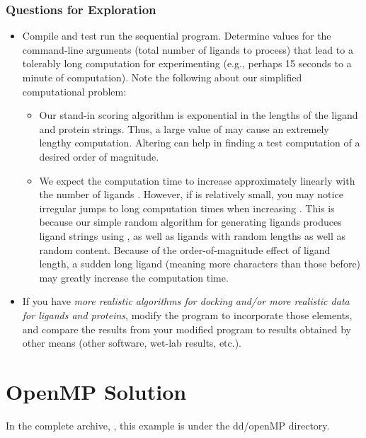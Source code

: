 \documentclass[letterpaper,10pt,openany,oneside]{sphinxmanual}
\begin{document}
\subsubsection{Questions for Exploration}
\label{sequentialimplementation/sequentialimplementation:questions-for-exploration}\label{sequentialimplementation/sequentialimplementation:stl-containers}\begin{itemize}
\item {} 
Compile and test run the sequential program. Determine values for the command-line arguments  (total number of ligands to process) that lead to a tolerably long computation for experimenting (e.g., perhaps 15 seconds to a minute of computation). Note the following about our simplified computational problem:
\begin{itemize}
\item {} 
Our stand-in scoring algorithm is exponential in the lengths of the ligand and protein strings. Thus, a large value of  may cause an extremely lengthy computation. Altering  can help in finding a test computation of a desired order of magnitude.

\item {} 
We expect the computation time to increase approximately linearly with the number of ligands . However, if  is relatively small, you may notice irregular jumps to long computation times when increasing . This is because our simple random algorithm for generating ligands produces ligand strings using , as well as ligands with random lengths as well as random content.  Because of the order-of-magnitude effect of ligand length, a sudden long ligand (meaning more characters than those before) may greatly increase the computation time.

\end{itemize}

\item {} 
If you have \emph{more realistic algorithms for docking and/or more realistic data for ligands and proteins}, modify the program to incorporate those elements, and compare the results from your modified program to results obtained by other means (other software, wet-lab results, etc.).

\end{itemize}


\section{OpenMP Solution}
\label{openmp/openmp:openmp-solution}\label{openmp/openmp::doc}
In the complete archive, , this example is under the dd/openMP directory.
\end{document}
